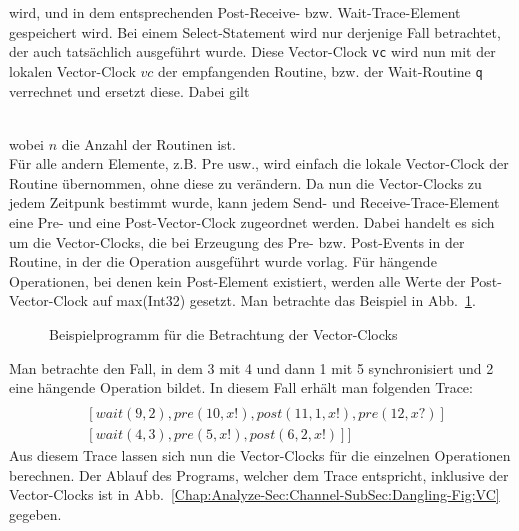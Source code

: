 wird, und in dem entsprechenden Post-Receive- bzw. Wait-Trace-Element gespeichert wird.
Bei einem Select-Statement wird nur derjenige Fall betrachtet, der auch tatsächlich ausgeführt wurde.
Diese Vector-Clock \texttt{vc}
wird nun mit der lokalen Vector-Clock $vc$ der empfangenden Routine, bzw. der Wait-Routine 
\texttt{q} verrechnet und ersetzt diese. Dabei gilt\\
\begin{figure}[h]
  \centering
  
\end{figure}\\
wobei $n$ die Anzahl der Routinen ist.\\
Für alle andern Elemente, z.B. Pre usw., wird einfach die lokale Vector-Clock der Routine übernommen, 
ohne diese zu verändern. Da nun die Vector-Clocks zu jedem Zeitpunk bestimmt wurde, kann jedem 
Send- und Receive-Trace-Element eine Pre- und eine Post-Vector-Clock zugeordnet werden. 
Dabei handelt es sich um die Vector-Clocks, die bei Erzeugung des Pre- bzw. Post-Events in 
der Routine, in der die Operation ausgeführt wurde vorlag. Für hängende Operationen, 
bei denen kein Post-Element existiert, werden alle Werte der Post-Vector-Clock auf 
max(Int32) gesetzt.
Man betrachte das Beispiel in Abb.~\ref{Chap:Analyze-Sec:Channel-SubSec:Dangling-Fig:PorgVC}.
\begin{figure}[h!]
  \centering
  
  \caption{Beispielprogramm für die Betrachtung der Vector-Clocks}
  \label{Chap:Analyze-Sec:Channel-SubSec:Dangling-Fig:PorgVC}
\end{figure}
Man betrachte den Fall, in dem 3 mit 4 und dann 1 mit 5 synchronisiert und 2 eine hängende Operation bildet.
In diesem Fall erhält man folgenden Trace:
\begin{align*}
  [&[signal(1, 2), signal(2, 3), pre(1, x?), post(7, 1, x?, 6), pre(8, x?), post(13, 1, x?, 11)]\\
  &[wait(9, 2), pre(10, x!), post(11, 1, x!), pre(12, x?)]\\
  &[wait(4, 3), pre(5, x!), post(6, 2, x!)]
  ]
\end{align*}
Aus diesem Trace lassen sich nun die Vector-Clocks für die einzelnen Operationen berechnen.
Der Ablauf des Programs, welcher dem Trace entspricht, inklusive der Vector-Clocks 
ist in Abb.~\ref{Chap:Analyze-Sec:Channel-SubSec:Dangling-Fig:VC} gegeben.
